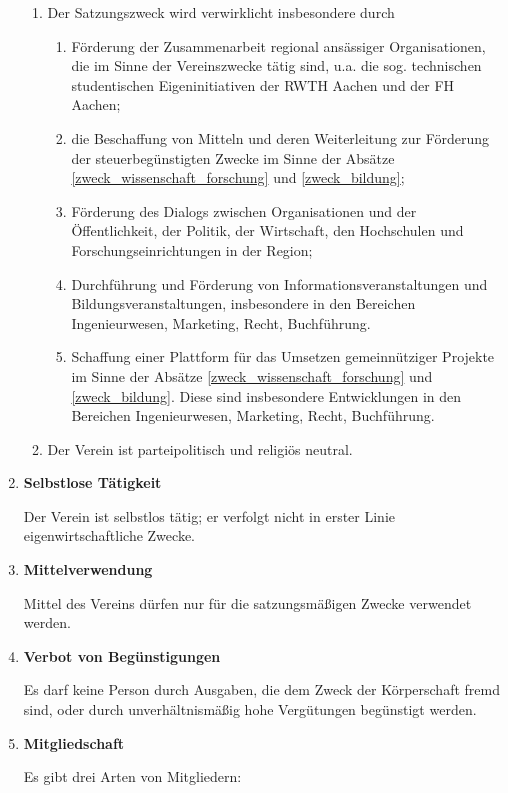 \documentclass[german]{article}
\newcommand{\paragr}[1]{\item \textsf{\textbf{#1}}}
\begin{document}
\begin{enumerate}
\begin{enumerate}
			\item Der Satzungszweck wird verwirklicht insbesondere durch
			\begin{enumerate}
				\item Förderung der Zusammenarbeit regional ansässiger Organisationen, die im Sinne der Vereinszwecke tätig sind, u.a. die sog. technischen studentischen Eigeninitiativen der RWTH Aachen und der FH Aachen;
				\item die Beschaffung von Mitteln und deren Weiterleitung zur Förderung der steuerbegünstigten Zwecke im Sinne der Absätze \ref{zweck_wissenschaft_forschung} und \ref{zweck_bildung};
				\item Förderung des Dialogs zwischen Organisationen und der Öffentlichkeit, der Politik, der Wirtschaft, den Hochschulen und Forschungseinrichtungen in der Region;
				\item Durchführung und Förderung von Informationsveranstaltungen und Bildungsveranstaltungen, insbesondere in den Bereichen Ingenieurwesen, Marketing, Recht, Buchführung.
				\item Schaffung einer Plattform für das Umsetzen gemeinnütziger Projekte im Sinne der Absätze \ref{zweck_wissenschaft_forschung} und \ref{zweck_bildung}. Diese sind insbesondere Entwicklungen in den Bereichen Ingenieurwesen, Marketing, Recht, Buchführung.
			\end{enumerate}
			
			\item Der Verein ist parteipolitisch und religiös neutral.
			
		\end{enumerate}
		
		\paragr{Selbstlose Tätigkeit}
		
		Der Verein ist selbstlos tätig; er verfolgt nicht in erster Linie eigenwirtschaftliche Zwecke.
		
		
		\paragr{Mittelverwendung}
		
		Mittel des Vereins dürfen nur für die satzungsmäßigen Zwecke verwendet werden.
		
		
		\paragr{Verbot von Begünstigungen}
		
		Es darf keine Person durch Ausgaben, die dem Zweck der Körperschaft fremd sind, oder durch unverhältnismäßig hohe Vergütungen begünstigt werden.
		
		
		\paragr{Mitgliedschaft}
		\label{mitglieder}
		
		Es gibt drei Arten von Mitgliedern:
		
		\begin{enumerate}
			

\end{enumerate}
\end{enumerate}
\end{document}
